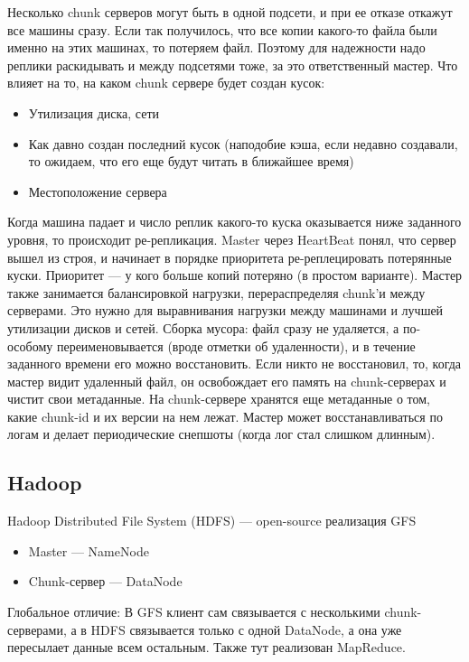     \quad Несколько chunk серверов могут быть в одной подсети, и при ее отказе откажут все машины сразу. Если так получилось, что все копии какого-то файла были именно на этих машинах, то потеряем файл. Поэтому для надежности надо реплики раскидывать и между подсетями тоже, за это ответственный мастер. Что влияет на то, на каком chunk сервере будет создан кусок:
    \begin{itemize}
        \item Утилизация диска, сети
        \item Как давно создан последний кусок (наподобие кэша, если недавно создавали, то ожидаем, что его еще будут читать в ближайшее время)
        \item Местоположение сервера
    \end{itemize}
    
    \quad Когда машина падает и число реплик какого-то куска оказывается ниже заданного уровня, то происходит ре-репликация. Master через HeartBeat понял, что сервер вышел из строя, и начинает в порядке приоритета ре-реплецировать потерянные куски. Приоритет --- у кого больше копий потеряно (в простом варианте). Мастер также занимается балансировкой нагрузки, перераспределяя chunk'и между серверами. Это нужно для выравнивания нагрузки между машинами и лучшей утилизации дисков и сетей. Сборка мусора: файл сразу не удаляется, а по-особому переименовывается (вроде отметки об удаленности), и в течение заданного времени его можно восстановить. Если никто не восстановил, то, когда мастер видит удаленный файл, он освобождает его память на chunk-серверах и чистит свои метаданные. На chunk-сервере хранятся еще метаданные о том, какие chunk-id и их версии на нем лежат. Мастер может восстанавливаться по логам и делает периодические снепшоты (когда лог стал слишком длинным).

\subsection{Hadoop}
    \quad Hadoop Distributed File System (HDFS) --- open-source реализация GFS
    \begin{itemize}
        \item Master --- NameNode
        \item Chunk-сервер --- DataNode
    \end{itemize}
    \quad Глобальное отличие: В GFS клиент сам связывается с несколькими chunk-серверами, а в HDFS связывается только с одной DataNode, а она уже пересылает данные всем остальным. Также тут реализован MapReduce.

